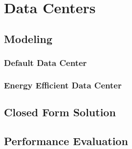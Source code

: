 \section{Data Centers}\label{sec:cloud:data_centers}
\cite{Schwartz2012a}

\subsection{Modeling}\label{sec:cloud:data_centers:modeling}
\subsubsection*{Default Data Center}\label{sec:cloud:data_centers:modeling:default}
\subsubsection*{Energy Efficient Data Center}\label{sec:cloud:data_centers:modeling:energy_efficient}
\subsection{Closed Form Solution}\label{sec:cloud:data_centers:closed_form_solution}
\subsection{Performance Evaluation}\label{sec:cloud:data_centers:performance_evaluation}

